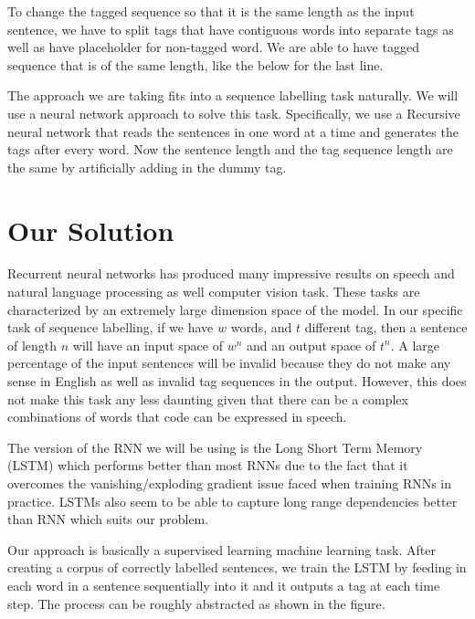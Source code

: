 \documentclass[fyp]{socreport}
\begin{document}
To change the tagged sequence so that it is the same length as the input
sentence, we have to split tags that have contiguous words into separate tags
as well as have placeholder for non-tagged word. We are able to have tagged
sequence that is of the same length, like the below for the last line.

\hspace{20pt}
     

The approach we are taking fits into a sequence labelling task naturally. We
will use a neural network approach to solve this task.  Specifically, we use a
Recursive neural network that reads the sentences in one word at a time and
generates the tags after every word. Now the sentence length and the tag
sequence length are the same by artificially adding in the dummy tag.


\section{Our Solution}
Recurrent neural networks has produced many impressive results on speech and
natural language processing as well computer vision task. These tasks are
characterized by an extremely large dimension space of the model. In our
specific task of sequence labelling, if we have $w$ words, and
$t$ different tag, then a sentence of length $n$ will have an input space
of $w^n$ and an output space of $t^n$. A large percentage of the input sentences
will be invalid because they do not make any sense in English as well as
invalid tag sequences in the output. However, this does not make this
task any less daunting given that there can be a complex combinations of words
that code can be expressed in speech.

The version of the RNN we will be using is the Long Short Term Memory (LSTM)
which performs better than most RNNs due to the fact that it overcomes
the vanishing/exploding gradient issue faced when training RNNs in practice.
LSTMs also seem to be able to capture long range dependencies better than
RNN which suits our problem.

Our approach is basically a supervised learning machine learning task. After
creating a corpus of correctly labelled sentences, we train the LSTM
by feeding in each word in a sentence sequentially into it and it outputs a tag
at each time step. The process can be roughly abstracted as shown in the
figure.
\end{document}
